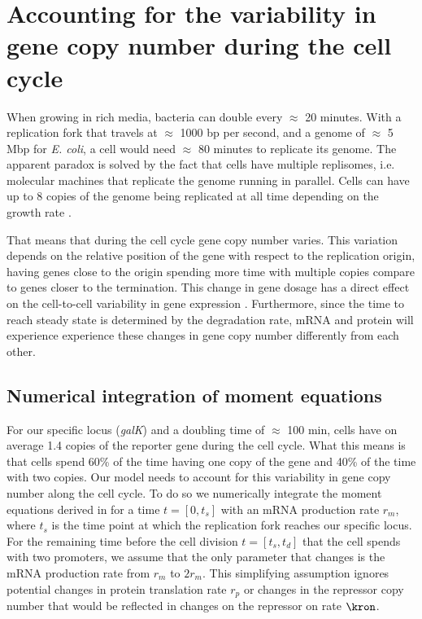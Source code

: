 \label{sec_multi_gene}
\section{Accounting for the variability in gene copy number during the cell
cycle}

When growing in rich media, bacteria can double every $\approx$ 20 minutes. With
a replication fork that travels at $\approx$ 1000 bp per second, and a genome of
$\approx$ 5 Mbp for {\it E. coli}\cite{Moran2010}, a cell would need $\approx$
80 minutes to replicate its genome. The apparent paradox is solved by the fact
that cells have multiple replisomes, i.e. molecular machines that replicate the
genome running in parallel. Cells can have up to 8 copies of the genome being
replicated at all time depending on the growth rate \cite{Bremer1996}.

That means that during the cell cycle gene copy number varies. This variation
depends on the relative position of the gene with respect to the replication
origin, having genes close to the origin spending more time with multiple copies
compare to genes closer to the termination. This change in gene dosage has a
direct effect on the cell-to-cell variability in gene expression
\cite{Jones2014a, Peterson2015}. Furthermore, since the time to reach steady
state is determined by the degradation rate, mRNA and protein will experience
experience these changes in gene copy number differently from each other.

\subsection{Numerical integration of moment equations}

For our specific locus ({\it galK}) and a doubling time of $\approx$ 100 min,
cells have on average 1.4 copies of the reporter gene during the cell cycle.
What this means is that cells spend 60\% of the time having one copy of the gene
and 40\% of the time with two copies. Our model needs to account for this
variability in gene copy number along the cell cycle. To do so we numerically
integrate the moment equations derived in  for a time $t = [0, t_s]$ with an mRNA production rate $r_m$, where
$t_s$ is the time point at which the replication fork reaches our specific
locus. For the remaining time before the cell division $t = [t_s, t_d]$ that the
cell spends with two promoters, we assume that the only parameter that changes
is the mRNA production rate from $r_m$ to $2 r_m$. This simplifying assumption
ignores potential changes in protein translation rate $r_p$ or changes in the
repressor copy number that would be reflected in changes on the repressor on
rate $\kron$.


